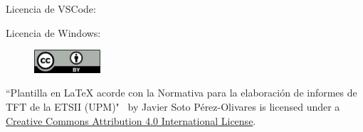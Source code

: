 \documentclass[a4paper, 12pt, spanish, twoside]{article}
\begin{document}
Licencia de VSCode: 

Licencia de Windows: 

\begin{figure}
    \vspace{-\baselineskip}
    \href{http://creativecommons.org/licenses/by/4.0/}{\includegraphics[width=0.22\textwidth]{licencias/cc-by.png}}
\end{figure} 

``Plantilla en LaTeX acorde con la Normativa para la elaboración de informes de TFT de la ETSII (UPM)" \ by Javier Soto Pérez-Olivares is licensed under a \href{http://creativecommons.org/licenses/by/4.0/}{Creative Commons Attribution 4.0 International License}.

\clearpage



\end{document}
